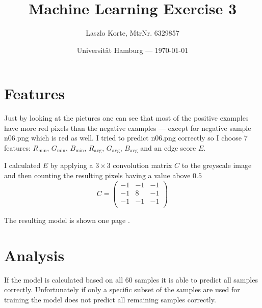 \documentclass[parskip=half,a4paper,portrait]{scrartcl}
\title{Machine Learning Exercise 3}
\author{Laszlo Korte, MtrNr. 6329857}
\date{Universität Hamburg --- \today}
\begin{document}
\maketitle

\section*{Features}

Just by looking at the pictures one can see that most of the positive examples have more red pixels than the negative examples --- except for negative sample n06.png which is red as well. I tried to predict n06.png correctly so I choose 7 features: $R_{\text{min}}$, $G_{\text{min}}$, $B_{\text{min}}$, $R_{\text{avg}}$, $G_{\text{avg}}$, $B_{\text{avg}}$ and an edge score $E$.

I calculated $E$ by applying a $3\times3$ convolution matrix $C$ to the greyscale image and then counting the resulting pixels having a value above $0.5$ \[C = \begin{pmatrix}
  -1 & -1 & -1 \\
  -1 & 8 & -1 \\
  -1 & -1 & -1 \\
\end{pmatrix}\]

The resulting model is shown one page \pageref{model}.

\section*{Analysis}

If the model is calculated based on all $60$ samples it is able to predict all samples correctly. Unfortunately if only a specific subset of the samples are used for training the model does not predict all remaining samples correctly.
\end{document}
